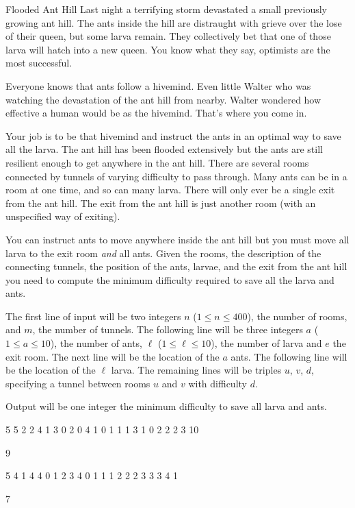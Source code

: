 \begin{problem}{Flooded Ant Hill}
Last night a terrifying storm devastated a small previously growing ant hill.
The ants inside the hill are distraught with grieve over the lose of their queen, but some larva remain.
They collectively bet that one of those larva will hatch into a new queen.
You know what they say, optimists are the most successful.

Everyone knows that ants follow a hivemind.
Even little Walter who was watching the devastation of the ant hill from nearby.
Walter wondered how effective a human would be as the hivemind.
That's where you come in.

Your job is to be that hivemind and instruct the ants in an optimal way to save all the larva.
The ant hill has been flooded extensively but the ants are still resilient enough to get anywhere in the ant hill.
There are several rooms connected by tunnels of varying difficulty to pass through.
Many ants can be in a room at one time, and so can many larva.
There will only ever be a single exit from the ant hill.
The exit from the ant hill is just another room (with an unspecified way of exiting).

You can instruct ants to move anywhere inside the ant hill but you must move all larva to the exit room \textit{and} all ants.
Given the rooms, the description of the connecting tunnels, the position of the ants, larvae, and the exit from the ant hill you need to compute the minimum difficulty required to save all the larva and ants.
\end{problem}

\begin{formalin}
The first line of input will be two integers $n$ ($1 \leq n \leq 400$), the number of rooms, and $m$, the number of tunnels.
The following line will be three integers $a$ ($1 \leq a \leq 10$), the number of ants, $\ell$ ($1 \leq \ell \leq 10$), the number of larva and $e$ the exit room.
The next line will be the location of the $a$ ants.
The following line will be the location of the $\ell$ larva.
The remaining lines will be triples $u$, $v$, $d$, specifying a tunnel between rooms $u$ and $v$ with difficulty $d$.
\end{formalin}

\begin{formalout}
Output will be one integer the minimum difficulty to save all larva and ants.
\end{formalout}

\begin{datain}
5 5
2 2 4
1 3
0 2
0 4 1
0 1 1
1 3 1
0 2 2
2 3 10
\end{datain}
\begin{dataout}
9
\end{dataout}
\begin{datain}
5 4
1 4 4
0
1 2 3 4
0 1 1
1 2 2
2 3 3
3 4 1
\end{datain}
\begin{dataout}
7
\end{dataout}
